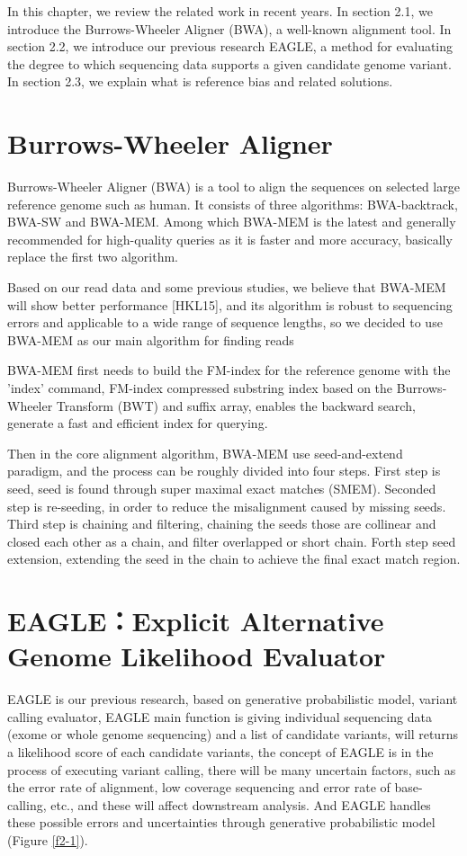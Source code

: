 \hspace{24pt}
In this chapter, we review the related work in recent years. In section 2.1, we introduce the Burrows-Wheeler Aligner (BWA), a well-known alignment tool. In section 2.2, we introduce our previous research EAGLE, a method for evaluating the degree to which sequencing data supports a given candidate genome variant. In section 2.3, we explain what is reference bias and related solutions.
\section{Burrows-Wheeler Aligner}
Burrows-Wheeler Aligner (BWA) \cite{li2009fast} is a tool to align the sequences on selected large reference genome such as human. It consists of three algorithms: BWA-backtrack, BWA-SW \cite{li2010fast} and BWA-MEM\cite{li2013aligning}. Among which BWA-MEM is the latest and generally recommended for high-quality queries as it is faster and more accuracy, basically replace the first two algorithm.

Based on our read data and some previous studies, we believe that BWA-MEM will show better performance [HKL15], and its algorithm is robust to sequencing errors and applicable to a wide range of sequence lengths, so we decided to use BWA-MEM as our main algorithm for finding reads

BWA-MEM first needs to build the FM-index \cite{ferragina2005indexing} for the reference genome with the 'index' command, FM-index compressed substring index based on the Burrows-Wheeler Transform (BWT) \cite{burrows1994block}and suffix array, enables the backward search, generate a fast and efficient index for querying.

Then in the core alignment algorithm, BWA-MEM use seed-and-extend paradigm, and the process can be roughly divided into four steps. First step is seed, seed is found through super maximal exact matches (SMEM). Seconded step is re-seeding, in order to reduce the misalignment caused by missing seeds. Third step is chaining and filtering, chaining the seeds those are collinear and closed each other as a chain, and filter overlapped or short chain. Forth step seed extension, extending the seed in the chain to achieve the final exact match region.
\section{EAGLE：Explicit Alternative Genome Likelihood Evaluator}
EAGLE \cite{kuo2018eagle}  is our previous research, based on generative probabilistic model, variant calling evaluator, EAGLE main function is giving individual sequencing data (exome or whole genome sequencing) and a list of candidate variants, will returns a likelihood score of each candidate variants, the concept of EAGLE is in the process of executing variant calling, there will be many uncertain factors, such as the error rate of alignment, low coverage sequencing and error rate of base-calling, etc., and these will affect downstream analysis. And EAGLE handles these possible errors and uncertainties through generative probabilistic model  (Figure \ref{f2-1}).

